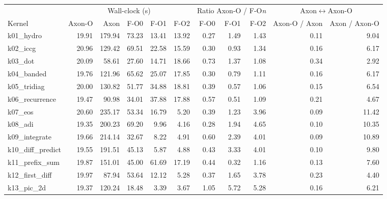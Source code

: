 \begin{table}
  \centering
  \small
  \setlength{\tabcolsep}{4pt}
  \begin{tabular}{@{}l r r r r r r r r r r@{}}
    \toprule
    & \multicolumn{5}{c}{Wall-clock (s)} & \multicolumn{3}{c}{Ratio Axon-O / F-O\textit{n}} & \multicolumn{2}{c}{Axon$\leftrightarrow$Axon-O} \\
    \cmidrule(lr){2-6} \cmidrule(lr){7-9} \cmidrule(lr){10-11}
    Kernel & Axon-O & Axon & F-O0 & F-O1 & F-O2 & F-O0 & F-O1 & F-O2 & {\small Axon-O / Axon} & {\small Axon / Axon-O} \\
    \midrule
    k01\_hydro                 &  19.91 &  179.94 & 73.23 & 13.41 & 13.92 &  0.27 &  1.49 &  1.43 &  0.11 &  9.04 \\
    k02\_iccg                  &  20.96 &  129.42 & 69.51 & 22.58 & 15.59 &  0.30 &  0.93 &  1.34 &  0.16 &  6.17 \\
    k03\_dot                   &  20.09 &   58.61 & 27.60 & 14.71 & 18.66 &  0.73 &  1.37 &  1.08 &  0.34 &  2.92 \\
    k04\_banded                &  19.76 &  121.96 & 65.62 & 25.07 & 17.85 &  0.30 &  0.79 &  1.11 &  0.16 &  6.17 \\
    k05\_tridiag               &  20.00 &  130.82 & 51.77 & 34.88 & 18.81 &  0.39 &  0.57 &  1.06 &  0.15 &  6.54 \\
    k06\_recurrence            &  19.47 &   90.98 & 34.01 & 37.88 & 17.88 &  0.57 &  0.51 &  1.09 &  0.21 &  4.67 \\
    k07\_eos                   &  20.60 &  235.17 & 53.34 & 16.79 &  5.20 &  0.39 &  1.23 &  3.96 &  0.09 & 11.42 \\
    k08\_adi                   &  19.35 &  200.23 & 69.20 &  9.96 &  4.16 &  0.28 &  1.94 &  4.65 &  0.10 & 10.35 \\
    k09\_integrate             &  19.66 &  214.14 & 32.67 &  8.22 &  4.91 &  0.60 &  2.39 &  4.01 &  0.09 & 10.89 \\
    k10\_diff\_predict         &  19.55 &  191.51 & 45.13 &  5.87 &  4.88 &  0.43 &  3.33 &  4.01 &  0.10 &  9.80 \\
    k11\_prefix\_sum           &  19.87 &  151.01 & 45.00 & 61.69 & 17.19 &  0.44 &  0.32 &  1.16 &  0.13 &  7.60 \\
    k12\_first\_diff           &  19.97 &   87.94 & 53.64 & 12.12 &  5.28 &  0.37 &  1.65 &  3.78 &  0.23 &  4.40 \\
    k13\_pic\_2d               &  19.37 &  120.24 & 18.48 &  3.39 &  3.67 &  1.05 &  5.72 &  5.28 &  0.16 &  6.21 \\

\end{tabular}
\end{table}
